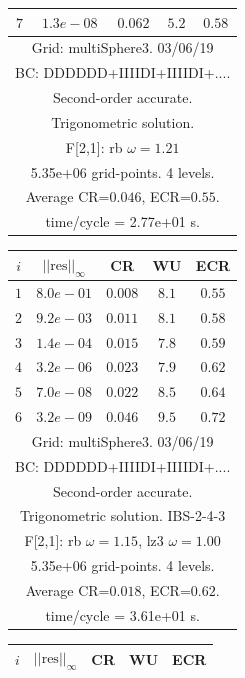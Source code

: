 \begin{table}[hbt]
\begin{center}
{\begin{tabular}{|c|c|c|c|c|}
 $ 7$  & $ 1.3e-08$ & $0.062$ & $ 5.2$ & $0.58$ \\ 
\hline 
\multicolumn{5}{|c|}{Grid: multiSphere3. 03/06/19}  \\
\multicolumn{5}{|c|}{BC: DDDDDD+IIIIDI+IIIIDI+....}  \\
\multicolumn{5}{|c|}{Second-order accurate.}  \\
\multicolumn{5}{|c|}{Trigonometric solution.}  \\
\multicolumn{5}{|c|}{F[2,1]: rb $\omega=1.21$}  \\
\multicolumn{5}{|c|}{5.35e+06 grid-points. 4 levels.}  \\
\multicolumn{5}{|c|}{Average CR=$0.046$, ECR=$0.55$.}  \\
\multicolumn{5}{|c|}{time/cycle = 2.77e+01 s.}  \\
\hline 
\end{tabular}
\begin{tabular}{|c|c|c|c|c|} \hline 
 $i$   & $\vert\vert\mbox{res}\vert\vert_\infty$  &  CR     &  WU    & ECR  \\   \hline 
 $ 1$  & $ 8.0e-01$ & $0.008$ & $ 8.1$ & $0.55$ \\ 
 $ 2$  & $ 9.2e-03$ & $0.011$ & $ 8.1$ & $0.58$ \\ 
 $ 3$  & $ 1.4e-04$ & $0.015$ & $ 7.8$ & $0.59$ \\ 
 $ 4$  & $ 3.2e-06$ & $0.023$ & $ 7.9$ & $0.62$ \\ 
 $ 5$  & $ 7.0e-08$ & $0.022$ & $ 8.5$ & $0.64$ \\ 
 $ 6$  & $ 3.2e-09$ & $0.046$ & $ 9.5$ & $0.72$ \\ 
\hline 
\multicolumn{5}{|c|}{Grid: multiSphere3. 03/06/19}  \\
\multicolumn{5}{|c|}{BC: DDDDDD+IIIIDI+IIIIDI+....}  \\
\multicolumn{5}{|c|}{Second-order accurate.}  \\
\multicolumn{5}{|c|}{Trigonometric solution. IBS-2-4-3}  \\
\multicolumn{5}{|c|}{F[2,1]: rb $\omega=1.15$, lz3 $\omega=1.00$}  \\
\multicolumn{5}{|c|}{5.35e+06 grid-points. 4 levels.}  \\
\multicolumn{5}{|c|}{Average CR=$0.018$, ECR=$0.62$.}  \\
\multicolumn{5}{|c|}{time/cycle = 3.61e+01 s.}  \\
\hline 
\end{tabular}
\begin{tabular}{|c|c|c|c|c|} \hline 
 $i$   & $\vert\vert\mbox{res}\vert\vert_\infty$  &  CR     &  WU    & ECR  \\   \hline 

\end{tabular}}
\end{center}
\end{table}
